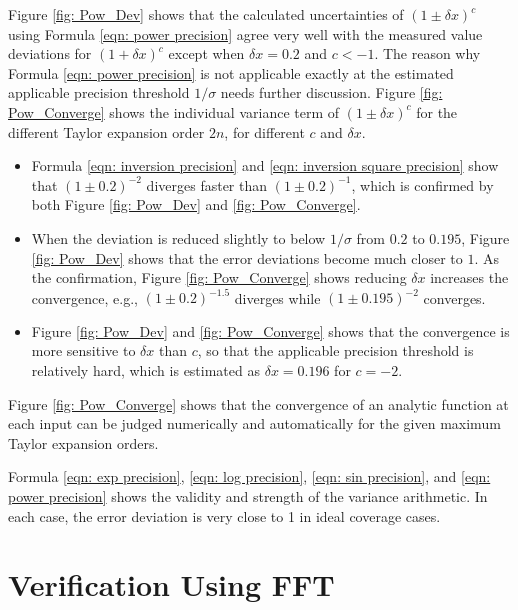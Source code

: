 \documentclass[twoside]{article}
\numberwithin{equation}{section}
\begin{document}
Figure \ref{fig: Pow_Dev} shows that the calculated uncertainties of $(1 \pm \delta x)^c$ using Formula \eqref{eqn: power precision} agree very well with the measured value deviations for $(1 + \delta x)^c$ except when $\delta x =0.2$ and $c < -1$.
The reason why Formula \eqref{eqn: power precision} is not applicable exactly at the estimated applicable precision threshold $1/\sigma$ needs further discussion.
Figure \ref{fig: Pow_Converge} shows the individual variance term of $(1 \pm \delta x)^c$ for the different Taylor expansion order $2n$, for different $c$ and $\delta x$.
\begin{itemize}

\item Formula \eqref{eqn: inversion precision} and \eqref{eqn: inversion square precision} show that $(1 \pm 0.2)^{-2}$ diverges faster than $(1 \pm 0.2)^{-1}$, which is confirmed by both Figure \ref{fig: Pow_Dev} and \ref{fig: Pow_Converge}.

\item 
When the deviation is reduced slightly to below $1/\sigma$ from $0.2$ to $0.195$, Figure \ref{fig: Pow_Dev} shows that the error deviations become much closer to $1$.  
As the confirmation, Figure \ref{fig: Pow_Converge} shows reducing $\delta x$ increases the convergence, e.g., $(1 \pm 0.2)^{-1.5}$ diverges while $(1 \pm 0.195)^{-2}$ converges.

\item Figure \ref{fig: Pow_Dev} and \ref{fig: Pow_Converge} shows that the convergence is more sensitive to $\delta x$ than $c$, so that the applicable precision threshold is relatively hard, which is estimated as $\delta x = 0.196$ for $c=-2$.

\end{itemize}
Figure \ref{fig: Pow_Converge} shows that the convergence of an analytic function at each input can be judged numerically and automatically for the given maximum Taylor expansion orders.

Formula \eqref{eqn: exp precision}, \eqref{eqn: log precision}, \eqref{eqn: sin precision}, and \eqref{eqn: power precision} shows the validity and strength of the variance arithmetic.
In each case, the error deviation is very close to 1 in ideal coverage cases.










\clearpage
\section{Verification Using FFT}
\label{sec: FFT}
\end{document}
